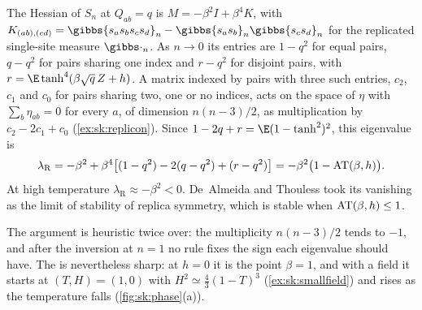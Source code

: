 \begin{refsection}
\begin{heuristic}
The Hessian of $S_n$ at $Q_{ab}=q$ is $M=-\beta^2I+\beta^4K$, with $K_{(ab),(cd)}=\gibbs{s_as_bs_cs_d}_n-\gibbs{s_as_b}_n\gibbs{s_cs_d}_n$ for the replicated single-site measure $\gibbs\cdot_n$. As $n\to0$ its entries are $1-q^2$ for equal pairs, $q-q^2$ for pairs sharing one index and $r-q^2$ for disjoint pairs, with $r=\E\tanh^4(\beta\sqrt q\,Z+h)$. A matrix indexed by pairs with three such entries, $c_2$, $c_1$ and $c_0$ for pairs sharing two, one or no indices, acts on the space of $\eta$ with $\sum_b\eta_{ab}=0$ for every $a$, of dimension $n(n-3)/2$, as multiplication by $c_2-2c_1+c_0$ (\cref{ex:sk:replicon}). Since $1-2q+r=\E(1-\tanh^2)^2$, this  eigenvalue is
\begin{equation}\label{eq:sk:replicon}
\lambda_{\mathrm R}=-\beta^2+\beta^4\bigl[(1-q^2)-2(q-q^2)+(r-q^2)\bigr]=-\beta^2\bigl(1-\mathrm{AT}(\beta,h)\bigr).
\end{equation}
At high temperature $\lambda_{\mathrm R}\approx-\beta^2<0$. De~Almeida and Thouless \parencite*{deAlmeidaThouless1978} took its vanishing as the limit of stability of replica symmetry, which is stable when $\mathrm{AT}(\beta,h)\le1$.
\end{heuristic}

The argument is heuristic twice over: the multiplicity $n(n-3)/2$ tends to $-1$, and after the inversion at $n=1$ no rule fixes the sign each eigenvalue should have. The  is nevertheless sharp: at $h=0$ it is the point $\beta=1$, and with a field it starts at $(T,H)=(1,0)$ with $H^2\simeq\frac43(1-T)^3$ (\cref{ex:sk:smallfield}) and rises as the temperature falls (\cref{fig:sk:phase}(a)).


\end{refsection}
